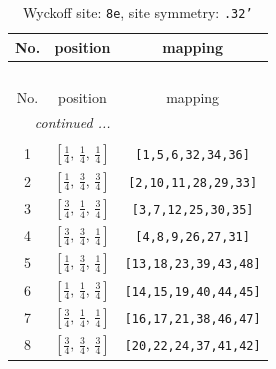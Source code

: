 \documentclass[fleqn,8pt]{jsarticle}
\begin{document}
\begin{longtable}{ccc}
\caption{Wyckoff site: {\tt 8e}, site symmetry: {\tt .32'}}
 \\
 \hline \hline
No. & position & mapping \\ \hline \endfirsthead

\multicolumn{2}{l}{\tablename\ \thetable{}} \\
 \hline \hline
No. & position & mapping \\ \hline \endhead

 \hline \hline
\multicolumn{2}{r}{\footnotesize\it continued ...} \\ \endfoot

 \hline \hline
\multicolumn{2}{r}{} \\ \endlastfoot

1 & $\left[ \frac{1}{4},\, \frac{1}{4},\, \frac{1}{4} \right]$ & {\tt [1,5,6,32,34,36]} \\ \hline
2 & $\left[ \frac{1}{4},\, \frac{3}{4},\, \frac{3}{4} \right]$ & {\tt [2,10,11,28,29,33]} \\ \hline
3 & $\left[ \frac{3}{4},\, \frac{1}{4},\, \frac{3}{4} \right]$ & {\tt [3,7,12,25,30,35]} \\ \hline
4 & $\left[ \frac{3}{4},\, \frac{3}{4},\, \frac{1}{4} \right]$ & {\tt [4,8,9,26,27,31]} \\ \hline
5 & $\left[ \frac{1}{4},\, \frac{3}{4},\, \frac{1}{4} \right]$ & {\tt [13,18,23,39,43,48]} \\ \hline
6 & $\left[ \frac{1}{4},\, \frac{1}{4},\, \frac{3}{4} \right]$ & {\tt [14,15,19,40,44,45]} \\ \hline
7 & $\left[ \frac{3}{4},\, \frac{1}{4},\, \frac{1}{4} \right]$ & {\tt [16,17,21,38,46,47]} \\ \hline
8 & $\left[ \frac{3}{4},\, \frac{3}{4},\, \frac{3}{4} \right]$ & {\tt [20,22,24,37,41,42]} \\
\end{longtable}
\renewcommand{\arraystretch}{1.2}
\end{document}
